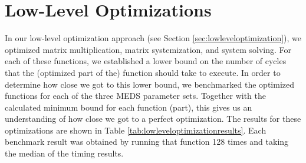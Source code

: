 \documentclass[11pt,a4paper]{report}
\theoremstyle{definition}
\begin{document}
\section{Low-Level Optimizations}
\label{sec:resultslowlevel}
In our low-level optimization approach (see Section \ref{sec:lowleveloptimization}), we optimized matrix multiplication, matrix systemization, and system solving. For each of these functions, we established a lower bound on the number of cycles that the (optimized part of the) function should take to execute. In order to determine how close we got to this lower bound, we benchmarked the optimized functions for each of the three MEDS parameter sets. Together with the calculated minimum bound for each function (part), this gives us an understanding of how close we got to a perfect optimization. The results for these optimizations are shown in Table \ref{tab:lowleveloptimizationresults}. Each benchmark result was obtained by running that function 128 times and taking the median of the timing results.

\begin{table}
  \centering
  \caption{Low-Level Optimization Results.}
  \label{tab:lowleveloptimizationresults}
\end{table}
\end{document}
